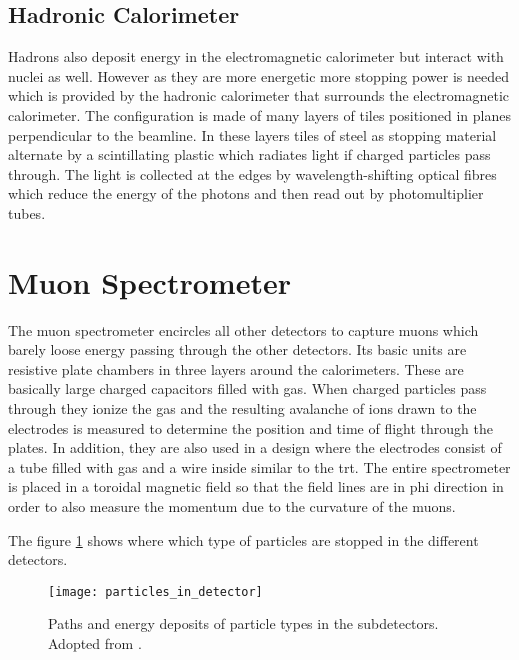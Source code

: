 \subsection*{Hadronic Calorimeter}

Hadrons also deposit energy in the electromagnetic calorimeter but interact with nuclei as well. However as they are more energetic more stopping power is needed which is provided by the hadronic calorimeter that surrounds the electromagnetic calorimeter. The configuration is made of many layers of tiles positioned in planes perpendicular to the beamline. In these layers tiles of steel as stopping material alternate by a scintillating plastic which radiates light if charged particles pass through. The light is collected at the edges by wavelength-shifting optical fibres  which reduce the energy of the photons and then read out by photomultiplier tubes.

\section{Muon Spectrometer}

The muon spectrometer encircles all other detectors to capture muons which barely loose energy passing through the other detectors. Its basic units are resistive plate chambers in three layers around the calorimeters. These are basically large charged capacitors filled with gas. When charged particles pass through they ionize the gas and the resulting avalanche of ions drawn to the electrodes is measured to determine the position and time of flight through the plates.  In addition, they are also used in a design where the electrodes consist of a tube filled with gas and a wire inside similar to the \ac{trt}. The entire spectrometer is placed in a toroidal magnetic field so that the field lines are in phi direction in order to also measure the momentum due to the curvature of the muons.

The figure \ref{fig:particles_in_detector} shows where which type of particles are stopped in the different detectors.
\begin{figure}
    \centering
    \texttt{[image: particles\_in\_detector]}
        \caption[]{Paths and energy deposits of particle types in the subdetectors. Adopted from \citep{Pequenao:1505342}.}
    \label{fig:particles_in_detector}    
\end{figure}


